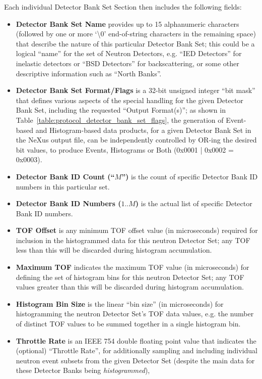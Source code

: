 Each individual Detector Bank Set Section then includes the
following fields:
\begin{itemize}
\item{\bf Detector Bank Set Name} provides up to 15 alphanumeric characters
(followed by one or more `\textbackslash0' end-of-string characters
in the remaining space)
that describe the nature of this particular Detector Bank Set;
this could be a logical ``name'' for the set of Neutron Detectors,
e.g. ``IED Detectors'' for inelastic detectors
or ``BSD Detectors'' for backscattering,
or some other descriptive information such as ``North Banks''.
\item{\bf Detector Bank Set Format/Flags} is a 32-bit unsigned integer
``bit mask'' that defines various aspects of the special handling
for the given Detector Bank Set,
including the requested ``Output Format(s)'';
as shown in Table~\ref{table:protocol_detector_bank_set_flags},
the generation of Event-based and Histogram-based data products,
for a given Detector Bank Set in the NeXus output file,
can be independently controlled by OR-ing the desired bit values,
to produce Events, Histograms or Both (0x0001 | 0x0002 = 0x0003).
\item{\bf Detector Bank ID Count (``$M$'')} is the count of specific
Detector Bank ID numbers in this particular set.
\item{\bf Detector Bank ID Numbers ($1..M$)} is the actual list of specific
Detector Bank ID numbers.
\item{\bf TOF Offset} is any minimum TOF offset value (in microseconds)
required for inclusion in the histogrammed data for this neutron
Detector Set;
any TOF less than this will be discarded during histogram accumulation.
\item{\bf Maximum TOF} indicates the maximum TOF value (in microseconds)
for defining the set of histogram bins for this neutron Detector Set;
any TOF values greater than this will be discarded during histogram
accumulation.
\item{\bf Histogram Bin Size} is the linear ``bin size'' (in microseconds)
for histogramming the neutron Detector Set's TOF data values,
e.g. the number of distinct TOF values to be summed together in a single
histogram bin.
\item{\bf Throttle Rate} is an IEEE 754 double floating point value that
indicates the (optional) ``Throttle Rate'', for additionally sampling
and including individual neutron event subsets from the given Detector Set
(despite the main data for these Detector Banks being {\it histogrammed}),

\end{itemize}
